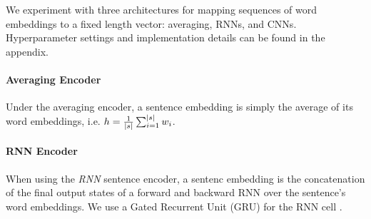 

We experiment with three architectures for mapping sequences
of word embeddings to a fixed length vector: averaging, RNNs, and CNNs.
Hyperparameter settings and implementation details can be found 
in the appendix.

\paragraph{Averaging Encoder} Under the averaging encoder, a sentence embedding
\sentEmb is simply the average of its word embeddings, i.e. $\sentEmb = \frac{1}{\sentSize} \sum_{i=1}^{\sentSize} \wordEmb[i]$.


%

\paragraph{RNN Encoder} When using  the \textit{RNN} sentence encoder,
a sentenc embedding is the 
concatenation 
of the
final output states of a forward and backward RNN over the sentence's word
embeddings. We use a Gated Recurrent Unit (GRU)  
for the RNN cell \cite{chung2014empirical}.

